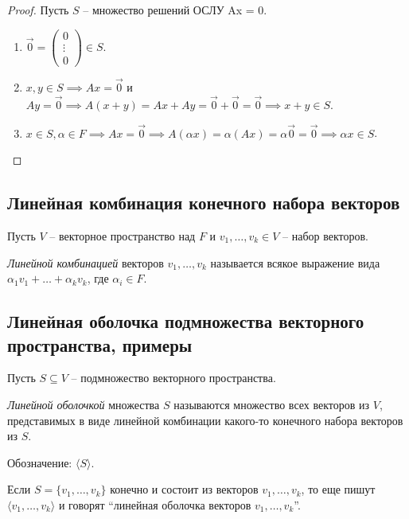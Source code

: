 \begin{proof}
    Пусть $S$ -- множество решений ОСЛУ Ax = 0.
    \begin{enumerate}
        \item $\overrightarrow{0} = \begin{pmatrix} 0 \\ \vdots \\ 0 \end{pmatrix} \in S$.
        \item $x, y \in S \implies Ax = \overrightarrow{0}$ и $Ay = \overrightarrow{0} \implies A(x + y) = Ax + Ay = \overrightarrow{0} + \overrightarrow{0} = \overrightarrow{0} \implies x + y \in S$.
        \item $x \in S, \alpha \in F \implies Ax = \overrightarrow{0} \implies A(\alpha x) = \alpha (Ax) = \alpha \overrightarrow{0} = \overrightarrow{0} \implies \alpha x \in S$. \qedhere
    \end{enumerate}
\end{proof}


\subsection{Линейная комбинация конечного набора векторов}

Пусть $V$ -- векторное пространство над $F$ и $v_1, \dots, v_k \in V$ -- набор векторов.

\begin{definition}
    \textit{Линейной комбинацией} векторов $v_1, \dots, v_k$ называется всякое выражение вида $\alpha_1 v_1 + \dots + \alpha_k v_k$, где $\alpha_i \in F$.
\end{definition}

\subsection{Линейная оболочка подмножества векторного пространства, примеры}

Пусть $S \subseteq V$ -- подмножество векторного пространства.

\begin{definition}
    \textit{Линейной оболочкой} множества $S$ называются множество всех векторов из $V$, представимых в виде линейной комбинации какого-то конечного набора векторов из $S$.

    Обозначение: $\langle S \rangle$.
\end{definition}

Если $S = \{v_1, \dots, v_k\}$ конечно и состоит из векторов $v_1, \dots, v_k$, то еще пишут $\langle v_1, \dots, v_k \rangle$ и говорят ``линейная оболочка векторов $v_1, \dots, v_k$''.

